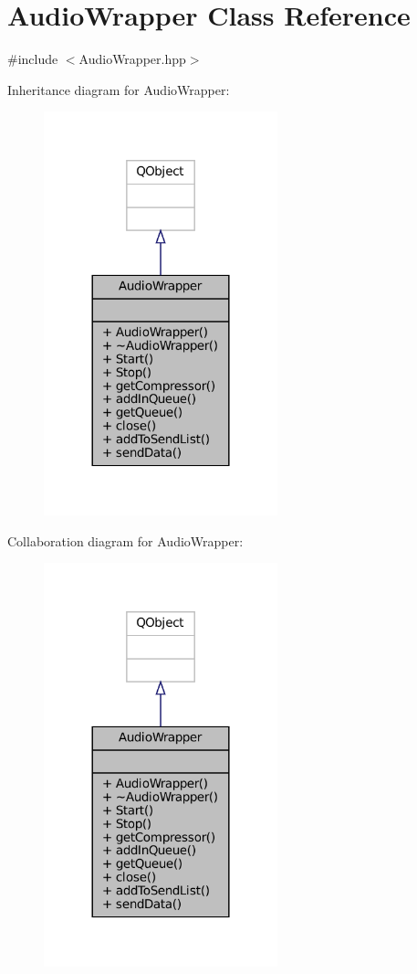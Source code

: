 \hypertarget{classAudioWrapper}{}\section{Audio\+Wrapper Class Reference}
\label{classAudioWrapper}


{\ttfamily \#include $<$Audio\+Wrapper.\+hpp$>$}



Inheritance diagram for Audio\+Wrapper\+:
\nopagebreak
\begin{figure}[H]
\begin{center}
\leavevmode
\includegraphics[width=192pt]{classAudioWrapper__inherit__graph}
\end{center}
\end{figure}


Collaboration diagram for Audio\+Wrapper\+:
\nopagebreak
\begin{figure}[H]
\begin{center}
\leavevmode
\includegraphics[width=192pt]{classAudioWrapper__coll__graph}
\end{center}
\end{figure}
